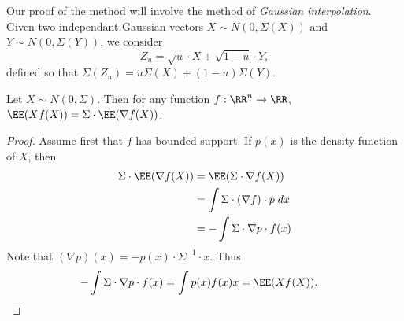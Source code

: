 Our proof of the method will involve the method of \emph{Gaussian interpolation}. Given two independant Gaussian vectors $X \sim N(0,\Sigma(X))$ and $Y \sim N(0,\Sigma(Y))$, we consider
%
\[ Z_u = \sqrt{u} \cdot X + \sqrt{1-u} \cdot Y, \]
%
defined so that $\Sigma(Z_u) = u \Sigma(X) + (1 - u) \Sigma(Y)$.

\begin{lemma}
    Let $X \sim N(0,\Sigma)$. Then for any function $f: \RR^n \to \RR$, $\EE(Xf(X)) = \Sigma \cdot \EE(\nabla f(X))$.
\end{lemma}
\begin{proof}
    Assume first that $f$ has bounded support. If $p(x)$ is the density function of $X$, then
    \begin{align*}
        \Sigma \cdot \EE(\nabla f(X)) &= \EE(\Sigma \cdot \nabla f(X))\\
        &= \int \Sigma \cdot (\nabla f) \cdot p\; dx\\
        &= - \int \Sigma \cdot \nabla p \cdot f(x)
    \end{align*}
    Note that $(\nabla p)(x) = -p(x) \cdot \Sigma^{-1} \cdot x$. Thus
    \begin{align*}
        - \int \Sigma \cdot \nabla p \cdot f(x) &= \int p(x) f(x) x = \EE(Xf(X)). \qedhere
    \end{align*}
\end{proof}

